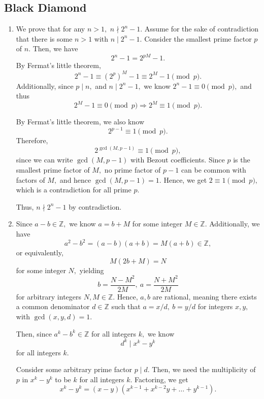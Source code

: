 \documentclass[12pt]{article}
\begin{document}
\subsection{Black Diamond}
\begin{enumerate}
  \item[11] We prove that for any $n > 1,$ $n \nmid 2^{n} - 1.$
    Assume for the sake of contradiction that there is some $n > 1$
    with $n \mid 2^{n} - 1.$ Consider the smallest prime factor $p$
    of $n.$ Then, we have
    $$
    2^{n} - 1 = 2^{pM} - 1.
    $$
    By Fermat's little theorem,
    $$
    2^n - 1 \equiv (2^{p})^M - 1 \equiv 2^M - 1 \pmod p.
    $$
    Additionally, since $p \mid n,$ and $n \mid 2^{n} -1,$ we know
    $2^{n} -1 \equiv 0 \pmod p,$ and thus $$
    2^{M} - 1 \equiv 0 \pmod {p} \Rightarrow 2^{M} \equiv 1 \pmod p.
    $$

    By Fermat's little theorem, we also know
    $$
    2^{p-1} \equiv 1 \pmod p.
    $$
    Therefore, $$2^{\gcd(M, p - 1)} \equiv 1 \pmod p,$$ since we can
    write $\gcd(M, p - 1)$ with Bezout coefficients. Since $p$ is the
    smallest prime factor of $M,$ no prime factor of $p - 1$ can be
    common with factors of $M,$ and hence $\gcd(M, p - 1) = 1.$
    Hence, we get $2 \equiv 1 \pmod p,$ which is a contradiction for
    all prime $p.$

    Thus, $n \nmid 2^{n} -1 $ by contradiction.

  \item[12] Since $a - b \in \mathbb Z,$ we know $a = b + M$ for some
    integer $M \in \mathbb Z.$ Additionally, we have
    $$
    a^2 - b^2 = (a-b)(a + b) = M(a + b) \in \mathbb Z,
    $$
    or equivalently,
    $$
    M(2b + M) = N
    $$
    for some integer $N,$ yielding $$
    b = \dfrac{N - M^2}{2M},\ a = \dfrac{N + M^2}{2M}
    $$
    for arbitrary integers $N, M \in \mathbb Z.$ Hence, $a, b$ are
    rational, meaning there exists a common denominator $d \in
    \mathbb Z$ such that
    $a = x/d,\ b = y/d$ for integers $x, y,$ with $\gcd(x, y,d) = 1.$

    Then, since $a^k - b^k \in \mathbb Z$ for all integers $k,$ we know
    $$
    d^k \mid x^k - y^k
    $$
    for all integers $k.$

    Consider some arbitrary prime factor $p \mid d.$ Then, we need
    the multiplicity of $p$ in $x^k - y^k$ to be $k$ for all integers
    $k.$ Factoring, we get
    $$
    x^k -y^k = (x-y)(x^{k - 1} + x^{k-2}y + \ldots + y^{k-1}).
    $$


\end{enumerate}
\end{document}
